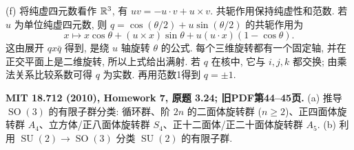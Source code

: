 \begin{solution}
(f) 将纯虚四元数看作 $\mathbb R^3$, 有 $uv=-u\cdot v+u\times v$. 共轭作用保持纯虚性和范数. 若 $u$ 为单位纯虚四元数, 则 $q=\cos(\theta/2)+u\sin(\theta/2)$ 的共轭作用为
\[
 x\longmapsto x\cos\theta+(u\times x)\sin\theta
              +u(u\cdot x)(1-\cos\theta).
\]
这由展开 $qx\bar q$ 得到, 是绕 $u$ 轴旋转 $\theta$ 的公式. 每个三维旋转都有一个固定轴, 并在正交平面上是二维旋转, 所以上式给出满射. 若 $q$ 在核中, 它与 $i,j,k$ 都交换; 由乘法关系比较系数可得 $q$ 为实数. 再用范数1得到 $q=\pm1$.
\end{solution}

\begin{exercise}\label{hw:3.24}
\textbf{MIT 18.712 (2010), Homework 7, 原题 3.24; 旧PDF第44--45页.}
(a) 推导 $\operatorname{SO}(3)$ 的有限子群分类: 循环群、阶 $2n$ 的二面体旋转群 ($n\ge2$)、正四面体旋转群 $A_4$、立方体/正八面体旋转群 $S_4$、正十二面体/正二十面体旋转群 $A_5$.
(b) 利用 $\operatorname{SU}(2)\to\operatorname{SO}(3)$ 分类 $\operatorname{SU}(2)$ 的有限子群.
\end{exercise}
